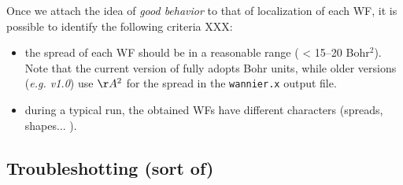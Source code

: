 \begin{itemize}
        Once we attach the idea of {\it good behavior} to that of localization of each WF,
        it is possible to identify the following criteria XXX: 
        \begin{itemize}
        \item    the spread of each WF should be in a reasonable range 
                 ( < 15--20 Bohr$^2$). Note that the current version of \WANT fully 
                 adopts Bohr units, while older versions ({\it e.g. v1.0}) use $\AA^2$ 
                 for the spread in the {\tt wannier.x} output file.
        \item    during a typical run, the obtained WFs have different characters 
                 (spreads, shapes... ). 
        \end{itemize}
        
                 
        
       


\end{itemize}


\subsection{Troubleshotting (sort of)}


